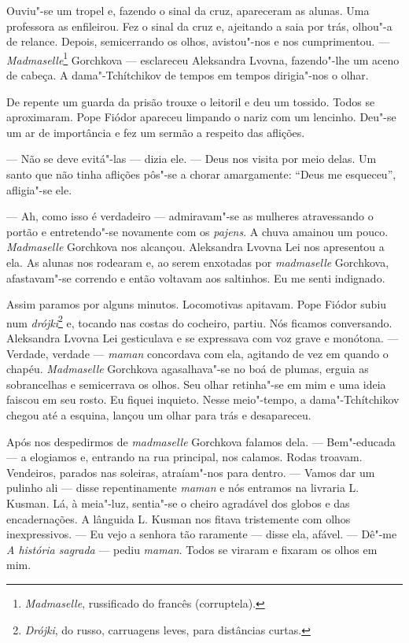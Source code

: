 Ouviu"-se um tropel e, fazendo o sinal da cruz, apareceram as alunas. Uma
professora as enfileirou. Fez o sinal da cruz e, ajeitando a saia por
trás, olhou"-a de relance. Depois, semicerrando os olhos, avistou"-nos e
nos cumprimentou. --- \emph{Madmaselle}\footnote{\emph{Madmaselle},
  russificado do francês (corruptela).} Gorchkova --- esclareceu
Aleksandra Lvovna, fazendo"-lhe um aceno de cabeça. A dama"-Tchítchikov de
tempos em tempos dirigia"-nos o olhar.

De repente um guarda da prisão trouxe o leitoril e deu um tossido. Todos
se aproximaram. Pope Fiódor apareceu limpando o nariz com um lencinho.
Deu"-se um ar de importância e fez um sermão a respeito das aflições.

--- Não se deve evitá"-las --- dizia ele. --- Deus nos visita por meio
delas. Um santo que não tinha aflições pôs"-se a chorar amargamente:
``Deus me esqueceu'', afligia"-se ele.

--- Ah, como isso é verdadeiro --- admiravam"-se as mulheres atravessando
o portão e entretendo"-se novamente com os \emph{pajens}. A chuva amainou
um pouco. \emph{Madmaselle} Gorchkova nos alcançou. Aleksandra Lvovna
Lei nos apresentou a ela. As alunas nos rodearam e, ao serem enxotadas
por \emph{madmaselle} Gorchkova, afastavam"-se correndo e então voltavam
aos saltinhos. Eu me senti indignado.

Assim paramos por alguns minutos. Locomotivas apitavam. Pope Fiódor
subiu num \emph{drójki}\footnote{\emph{Drójki}, do russo, carruagens
  leves, para distâncias curtas.} e, tocando nas costas do cocheiro,
partiu. Nós ficamos conversando. Aleksandra Lvovna Lei gesticulava e se
expressava com voz grave e monótona. --- Verdade, verdade ---
\emph{maman} concordava com ela, agitando de vez em quando o chapéu.
\emph{Madmaselle} Gorchkova agasalhava"-se no boá de plumas, erguia as
sobrancelhas e semicerrava os olhos. Seu olhar retinha"-se em mim e uma
ideia faiscou em seu rosto. Eu fiquei inquieto. Nesse meio"-tempo, a
dama"-Tchítchikov chegou até a esquina, lançou um olhar para trás e
desapareceu.

Após nos despedirmos de \emph{madmaselle} Gorchkova falamos dela. ---
Bem"-educada --- a elogiamos e, entrando na rua principal, nos calamos.
Rodas troavam. Vendeiros, parados nas soleiras, atraíam"-nos para dentro.
--- Vamos dar um pulinho ali --- disse repentinamente \emph{maman} e nós
entramos na livraria L. Kusman. Lá, à meia"-luz, sentia"-se o cheiro
agradável dos globos e das encadernações. A lânguida L. Kusman nos
fitava tristemente com olhos inexpressivos. --- Eu vejo a senhora tão
raramente --- disse ela, afável. --- Dê"-me \emph{A história sagrada} ---
pediu \emph{maman}. Todos se viraram e fixaram os olhos em mim.

